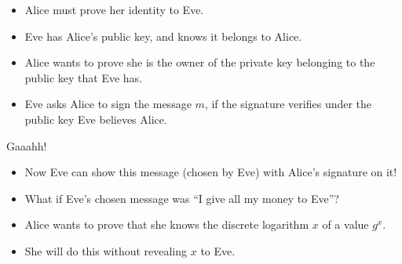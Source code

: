 \begin{frame}
  \begin{example}
    \begin{itemize}
      \item Alice must prove her identity to Eve.

      \item Eve has Alice's public key, and knows it belongs to Alice.

        \pause{}
        
      \item Alice wants to prove she is the owner of the private key belonging 
        to the public key that Eve has.

        \pause{}

      \item Eve asks Alice to sign the message \(m\), if the signature verifies
        under the public key Eve believes Alice.
        
    \end{itemize}
  \end{example}

  \pause{}

  \begin{alertblock}{Gaaahh!}
    \begin{itemize}
      \item Now Eve can show this message (chosen by Eve) with Alice's 
        signature on it!
      \item What if Eve's chosen message was \enquote{I give all my money to 
          Eve}?
    \end{itemize}
  \end{alertblock}
\end{frame}

\begin{frame}
  \begin{idea}
    \begin{itemize}
      \item Alice wants to prove that she knows the discrete logarithm \(x\) of 
        a value \(g^x\).

      \item She will do this without revealing \(x\) to Eve.
    \end{itemize}
  \end{idea}
\end{frame}

